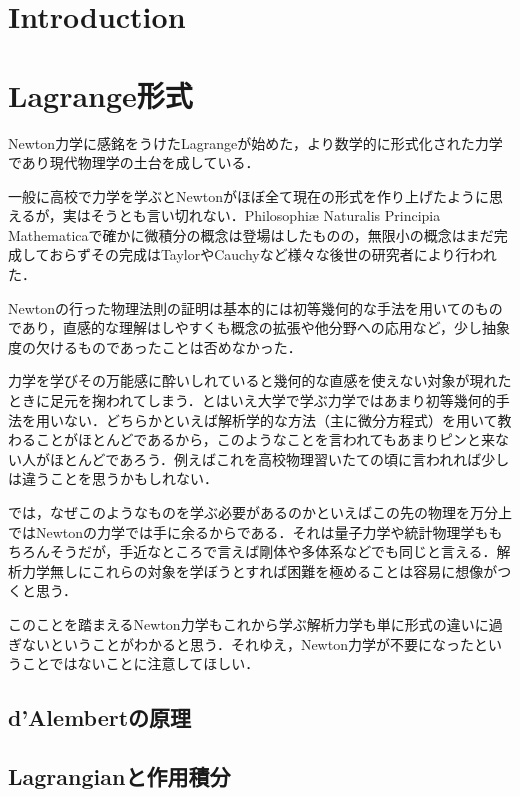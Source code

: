 \documentclass[../main]{subfiles}
\begin{document}
    \section*{Introduction}

    \section{Lagrange形式}
    Newton力学に感銘をうけたLagrangeが始めた，より数学的に形式化された力学であり現代物理学の土台を成している．
    
    一般に高校で力学を学ぶとNewtonがほぼ全て現在の形式を作り上げたように思えるが，実はそうとも言い切れない．Philosophiæ Naturalis Principia Mathematicaで確かに微積分の概念は登場はしたものの，無限小の概念はまだ完成しておらずその完成はTaylorやCauchyなど様々な後世の研究者により行われた．
    
    Newtonの行った物理法則の証明は基本的には初等幾何的な手法を用いてのものであり，直感的な理解はしやすくも概念の拡張や他分野への応用など，少し抽象度の欠けるものであったことは否めなかった．

    力学を学びその万能感に酔いしれていると幾何的な直感を使えない対象が現れたときに足元を掬われてしまう．とはいえ大学で学ぶ力学ではあまり初等幾何的手法を用いない．どちらかといえば解析学的な方法（主に微分方程式）を用いて教わることがほとんどであるから，このようなことを言われてもあまりピンと来ない人がほとんどであろう．例えばこれを高校物理習いたての頃に言われれば少しは違うことを思うかもしれない．

    では，なぜこのようなものを学ぶ必要があるのかといえばこの先の物理を万分上ではNewtonの力学では手に余るからである．それは量子力学や統計物理学ももちろんそうだが，手近なところで言えば剛体や多体系などでも同じと言える．解析力学無しにこれらの対象を学ぼうとすれば困難を極めることは容易に想像がつくと思う．

    このことを踏まえるNewton力学もこれから学ぶ解析力学も単に形式の違いに過ぎないということがわかると思う．それゆえ，Newton力学が不要になったということではないことに注意してほしい．

    \subsection{d'Alembertの原理}

    \subsection{Lagrangianと作用積分}
\end{document}
